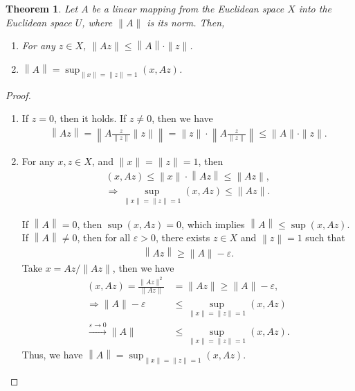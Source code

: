 \documentclass[11pt]{book}
\newtheorem{theorem}{Theorem}[chapter]
\theoremstyle{definition}
\numberwithin{equation}{chapter}
\begin{document}
\begin{theorem}
Let $A$ be a linear mapping from the Euclidean space $X$ into the
Euclidean space $U$, where $\|A\|$ is its norm. Then, 
\begin{enumerate}[label=(\alph*)]
    \item For any $z\in X$, $\|Az\|\leq \left\|A\right\|\cdot \|z\|$.
    \item $\left\|A\right\| = \sup_{\|x\| = \|z\| = 1} (x, Az)$.
\end{enumerate}
\end{theorem}
\begin{proof}
~\begin{enumerate}[label=(\alph*)]
    \item If $z = 0$, then it holds. If $z\neq 0$, then we have 
    \begin{align*}
        \left\|Az\right\| = \left\|A \frac{z}{\|z\|}\|z\|\right\| = \|z\|\cdot \left\|A \frac{z}{\|z\|}\right\| \leq \|A\|\cdot \|z\|.
    \end{align*}
    \item For any $x,z\in X$, and $\|x\| = \|z\| = 1$, then 
    \begin{align*}
        (x, Az) \leq \|x\| \cdot \left\|Az\right\| \leq \|Az\|, \\
        \Rightarrow \sup_{\|x\| = \|z\| = 1} (x, Az) \leq \|Az\|.
    \end{align*}
    
    If $\left\|A\right\| = 0$, then $\sup (x, Az) = 0$, which implies $\left\|A\right\| \leq \sup (x, Az)$. If $\left\|A\right\| \neq 0$, then for all $\varepsilon > 0$, there exists $z \in X$ and $\left\|z\right\| = 1$ such that 
    \begin{align*}
        \left\|Az\right\| \geq \|A\| - \varepsilon.
    \end{align*}
    Take $x = Az/ \|Az\|$, then we have 
    \begin{align*}
        (x, Az) = \frac{\|Az\|^2}{\|Az\|} & = \|Az\| \geq \|A\| - \varepsilon, \\
        \Rightarrow \|A\| - \varepsilon & \leq \sup_{\|x\| = \|z\| = 1} (x, Az) \\
        \xrightarrow{\varepsilon \to 0} \|A\| & \leq \sup_{\|x\| = \|z\| = 1} (x, Az).
    \end{align*}
    Thus, we have $\left\|A\right\| = \sup_{\|x\| = \|z\| = 1} (x, Az)$.
\end{enumerate}
\end{proof}
\end{document}
